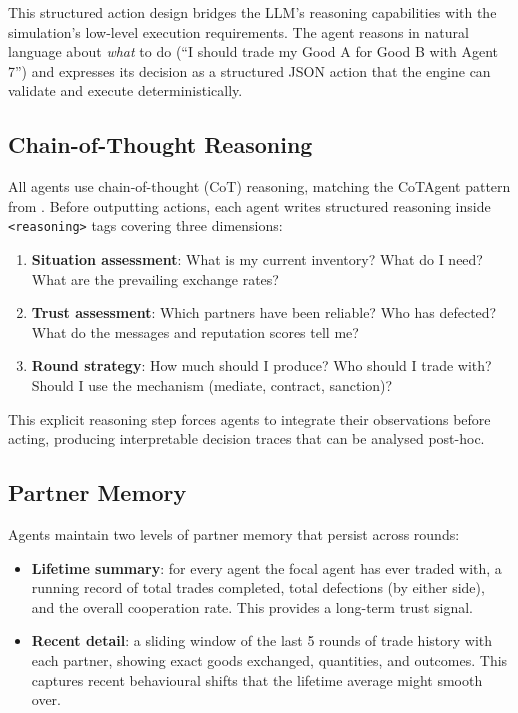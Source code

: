 \documentclass{article}
\begin{document}
This structured action design bridges the LLM's reasoning capabilities with the simulation's low-level execution requirements. The agent reasons in natural language about \textit{what} to do (``I should trade my Good A for Good B with Agent 7'') and expresses its decision as a structured JSON action that the engine can validate and execute deterministically.

\subsection{Chain-of-Thought Reasoning}

All agents use chain-of-thought (CoT) reasoning, matching the CoTAgent pattern from \citet{coopeval}. Before outputting actions, each agent writes structured reasoning inside \texttt{<reasoning>} tags covering three dimensions:

\begin{enumerate}
  \item \textbf{Situation assessment}: What is my current inventory? What do I need? What are the prevailing exchange rates?
  \item \textbf{Trust assessment}: Which partners have been reliable? Who has defected? What do the messages and reputation scores tell me?
  \item \textbf{Round strategy}: How much should I produce? Who should I trade with? Should I use the mechanism (mediate, contract, sanction)?
\end{enumerate}

This explicit reasoning step forces agents to integrate their observations before acting, producing interpretable decision traces that can be analysed post-hoc.

\subsection{Partner Memory}

Agents maintain two levels of partner memory that persist across rounds:

\begin{itemize}
  \item \textbf{Lifetime summary}: for every agent the focal agent has ever traded with, a running record of total trades completed, total defections (by either side), and the overall cooperation rate. This provides a long-term trust signal.
  \item \textbf{Recent detail}: a sliding window of the last 5 rounds of trade history with each partner, showing exact goods exchanged, quantities, and outcomes. This captures recent behavioural shifts that the lifetime average might smooth over.
\end{itemize}
\end{document}
